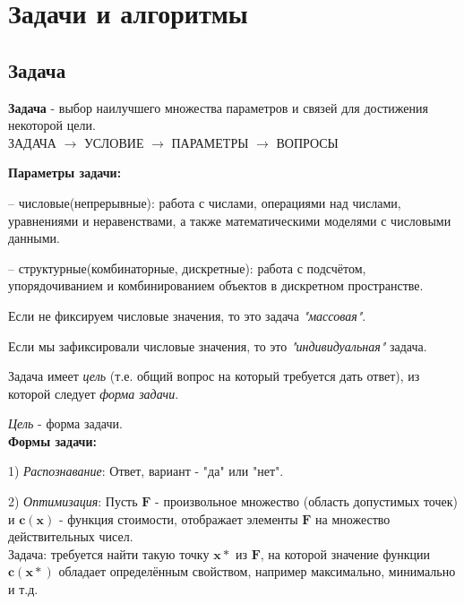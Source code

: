     
    \clearpage
    
  

	\section{Задачи и алгоритмы}

	\subsection{Задача}
	 
	\begin{definition}
	\textbf{Задача} - выбор наилучшего множества параметров и связей для достижения некоторой цели.
	\\
	ЗАДАЧА $\rightarrow$ УСЛОВИЕ $\rightarrow$ ПАРАМЕТРЫ $\rightarrow$ ВОПРОСЫ
    \end{definition}
    
    \textbf{Параметры задачи:}
    
    \par -- числовые(непрерывные):
    работа с числами, операциями над числами, уравнениями и неравенствами, а также математическими моделями с числовыми данными.
    \par -- структурные(комбинаторные, дискретные):
    работа с подсчётом, упорядочиванием и комбинированием объектов в дискретном пространстве.\\
     
    \par Если не фиксируем числовые значения, то это задача \textit{"массовая"}. 
    \par Если мы зафиксировали числовые значения, то это \textit{"индивидуальная"} задача. \\

	\par Задача имеет \textit{цель} (т.е. общий вопрос на который требуется дать ответ), из которой следует \textit{форма задачи}.
	
	\par \textit{Цель} - форма задачи. \\
	
	\textbf{Формы задачи:}
    
    \par 1) \textit{Распознавание}:
    Ответ, вариант - "да" или "нет".
    
    \par 2) \textit{Оптимизация}:
    Пусть $\boldsymbol{F}$ - произвольное множество (область допустимых точек) и $\boldsymbol{c(x)}$ - функция стоимости, отображает элементы $\boldsymbol{F}$ на множество действительных чисел. 
    \\
    Задача: требуется найти такую точку $\boldsymbol{x*}$ из $\boldsymbol{F}$, на которой значение функции $\boldsymbol{c(x*)}$ обладает определённым свойством, например максимально, минимально и т.д.
    
